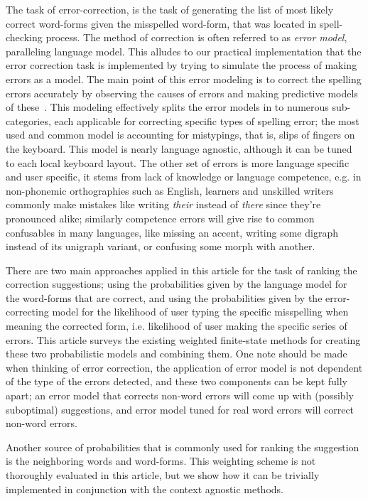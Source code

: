 \documentclass[a4paper,12pt]{article}
\begin{document}
The task of error-correction, is the task of generating the list of most likely
correct word-forms given the misspelled word-form, that was located in
spell-checking process. The method of correction is often referred to as
\emph{error model}, paralleling language model. This alludes to our practical
implementation that the error correction task is implemented by trying to
simulate the process of making errors as a model. The main point of this error
modeling is to correct the spelling errors accurately by observing the causes
of errors and making predictive models of
these~\cite[]{deorowicz2005correcting}.  This modeling effectively splits the
error models in to numerous sub-categories, each applicable for correcting
specific types of spelling error; the most used and common model is accounting
for mistypings, that is, slips of fingers on the keyboard. This model is nearly
language agnostic, although it can be tuned to each local keyboard layout. The
other set of errors is more language specific and user specific, it stems from
lack of knowledge or language competence, e.g.  in non-phonemic orthographies
such as English, learners and unskilled writers commonly make mistakes like
writing \emph{their} instead of \emph{there} since they're pronounced alike;
similarly competence errors will give rise to common confusables in many
languages, like missing an accent, writing some digraph instead of its unigraph
variant, or confusing some morph with another.

There are two main approaches applied in this article for the task of ranking
the correction suggestions; using the probabilities given by the language model
for the word-forms that are correct, and using the probabilities given by the
error-correcting model for the likelihood of user typing the specific
misspelling when meaning the corrected form, i.e. likelihood of user making the
specific series of errors. This article surveys the existing weighted
finite-state methods for creating these two probabilistic models and combining
them. One note should be made when thinking of error correction, the
application of error model is not dependent of the type of the errors detected,
and these two components can be kept fully apart; an error model that corrects
non-word errors will come up with (possibly suboptimal) suggestions, and error
model tuned for real word errors will correct non-word errors.

Another source of probabilities that is commonly used
\cite[]{pirinen2012improving,otero/2007} for ranking the suggestion is the
neighboring words and word-forms. This weighting scheme is not thoroughly
evaluated in this article, but we show how it can be trivially implemented in
conjunction with the context agnostic methods.
\end{document}
